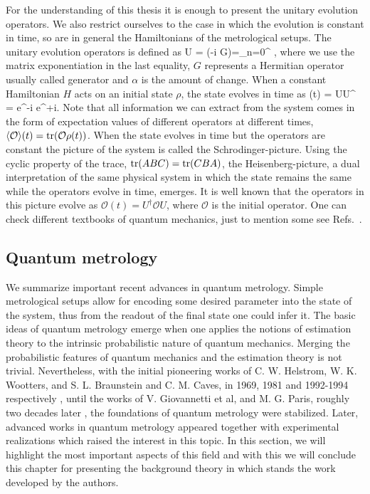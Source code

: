 For the understanding of this thesis it is enough to present the unitary evolution operators.
We also restrict ourselves to the case in which the evolution is constant in time, so are in general the Hamiltonians of the metrological setups.
The unitary evolution operators is defined as
\be
  U = \exp(-i \alpha G)=\sum_{n=0}^{\infty} ,
\ee
where we use the matrix exponentiation in the last equality, $G$ represents a Hermitian operator usually called generator and $\alpha$ is the amount of change.
When a constant Hamiltonian $H$ acts on an initial state $\rho$, the state evolves in time as
\be
  \rho(t) = U\rho U^{\dagger} = e^{-i} \rho e^{+i}.
\ee
Note that all information we can extract from the system comes in the form of expectation values of different operators at different times, $\langle{\mathcal{O}}\rangle(t) = \operatorname{tr}(\mathcal{O}\rho(t))$.
When the state evolves in time but the operators are constant the picture of the system is called the Schrodinger-picture.
Using the cyclic property of the trace, $\operatorname{tr}(ABC) = \operatorname{tr}(CBA)$, the Heisenberg-picture, a dual interpretation of the same physical system in which the state remains the same while the operators evolve in time, emerges.
It is well known that the operators in this picture evolve as $\mathcal{O}(t) = U^{\dagger} \mathcal{O} U$, where $\mathcal{O}$ is the initial operator.
One can check different textbooks of quantum mechanics, just to mention some see Refs.~\cite{Cohen-Tannoudji1977, Sakurai2010}.

\subsection{Quantum metrology}
\label{sec:bg-quantum-metrology}

We summarize important recent advances in quantum metrology.
Simple metrological setups allow for encoding some desired parameter into the state of the system, thus from the readout of the final state one could infer it.
The basic ideas of quantum metrology emerge when one applies the notions of estimation theory to the intrinsic probabilistic nature of quantum mechanics.
Merging the probabilistic features of quantum mechanics and the estimation theory is not trivial.
Nevertheless, with the initial pioneering works of C. W. Helstrom, W. K. Wootters, and S. L. Braunstein and C. M. Caves, in 1969, 1981 and 1992-1994 respectively \cite{Helstrom1969, Wootters1981, Braunstein1992, Braunstein1994}, until the works of V. Giovannetti et al, and M. G. Paris, roughly two decades later \cite{Giovannetti2004, Paris2009}, the foundations of quantum metrology were stabilized.
Later, advanced works in quantum metrology appeared \cite{Hyllus2010, Hyllus2012, Hyllus2010a, Kolodynski2010, Kolodynski2013}
together with experimental realizations \cite{Behbood2013, Koschorreck2011, Luecke2011} which raised the interest in this topic.
In this section, we will highlight the most important aspects of this field and with this we will conclude this chapter for presenting the background theory in which stands the work developed by the authors.

